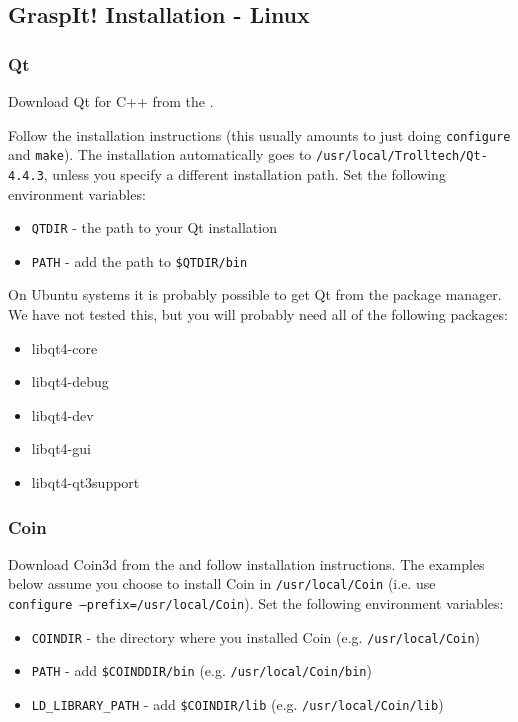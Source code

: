 \subsection{GraspIt! Installation - Linux}

\subsubsection{Qt}

Download Qt for C++ from the .

Follow the installation instructions (this usually amounts to just
doing \texttt{configure} and \texttt{make}). The installation
automatically goes to \texttt{/usr/local/Trolltech/Qt-4.4.3}, unless
you specify a different installation path. Set the following
environment variables:

\begin{itemize}
\item \texttt{QTDIR} - the path to your Qt installation 
\item \texttt{PATH} - add the path to \texttt{\$QTDIR/bin}
\end{itemize}

On Ubuntu systems it is probably possible to get Qt from the package
manager. We have not tested this, but you will probably need all of
the following packages:

\begin{itemize}
\item libqt4-core
\item libqt4-debug
\item libqt4-dev
\item libqt4-gui
\item libqt4-qt3support
\end{itemize}

\subsubsection{Coin}

Download Coin3d from the  and
follow installation instructions. The examples below assume you choose
to install Coin in \texttt{/usr/local/Coin} (i.e. use
\texttt{configure~--prefix=/usr/local/Coin}). Set the following
environment variables:

\begin{itemize}
\item \texttt{COINDIR} - the directory where you installed Coin
  (e.g. \texttt{/usr/local/Coin})
\item \texttt{PATH} - add \texttt{\$COINDDIR/bin}
  (e.g. \texttt{/usr/local/Coin/bin})
\item \texttt{LD\_LIBRARY\_PATH} - add \texttt{\$COINDIR/lib}
  (e.g. \texttt{/usr/local/Coin/lib})
\end{itemize}

